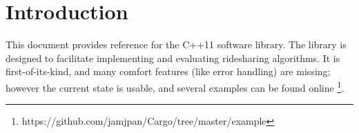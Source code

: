 \section{Introduction}

This document provides reference for the  C++11 software
library.  The library is designed to facilitate implementing and evaluating
ridesharing algorithms.  It is first-of-its-kind, and many comfort
features (like error handling) are missing; however the current state is
usable, and several examples can be found online
\footnote{https://github.com/jamjpan/Cargo/tree/master/example}.


